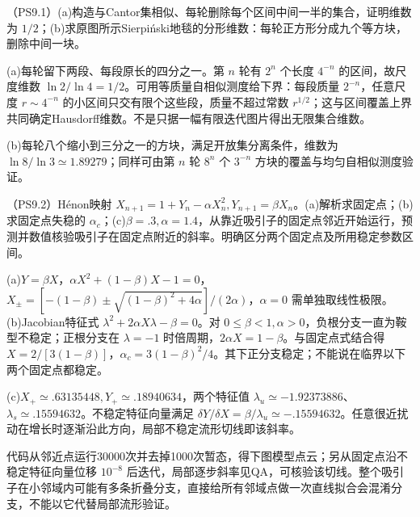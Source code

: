 \begin{exercise}
（PS9.1）(a)构造与Cantor集相似、每轮删除每个区间中间一半的集合，证明维数为 $1/2$；(b)求原图所示Sierpiński地毯的分形维数：每轮正方形分成九个等方块，删除中间一块。
\end{exercise}
\begin{solution}
(a)每轮留下两段、每段原长的四分之一。第 $n$ 轮有 $2^n$ 个长度 $4^{-n}$ 的区间，故尺度维数 $\ln2/\ln4=1/2$。可用等质量自相似测度给下界：每段质量 $2^{-n}$，任意尺度 $r\sim4^{-n}$ 的小区间只交有限个这些段，质量不超过常数 $r^{1/2}$；这与区间覆盖上界共同确定Hausdorff维数。不是只据一幅有限迭代图片得出无限集合维数。

(b)每轮八个缩小到三分之一的方块，满足开放集分离条件，维数为 $\ln8/\ln3\simeq1.89279$；同样可由第 $n$ 轮 $8^n$ 个 $3^{-n}$ 方块的覆盖与均匀自相似测度验证。
\end{solution}

\begin{exercise}
（PS9.2）Hénon映射 $X_{n+1}=1+Y_n-\alpha X_n^2,Y_{n+1}=\beta X_n$。(a)解析求固定点；(b)求固定点失稳的 $\alpha_c$；(c)$\beta=.3,\alpha=1.4$，从靠近吸引子的固定点邻近开始运行，预测并数值核验吸引子在固定点附近的斜率。明确区分两个固定点及所用稳定参数区间。
\end{exercise}
\begin{solution}
(a)$Y=\beta X$，$\alpha X^2+(1-\beta)X-1=0$，$X_\pm=[-(1-\beta)\pm\sqrt{(1-\beta)^2+4\alpha}]/(2\alpha)$，$\alpha=0$ 需单独取线性极限。(b)Jacobian特征式 $\lambda^2+2\alpha X\lambda-\beta=0$。对 $0\le\beta<1,\alpha>0$，负根分支一直为鞍型不稳定；正根分支在 $\lambda=-1$ 时倍周期，$2\alpha X=1-\beta$。与固定点式结合得 $X=2/[3(1-\beta)]$，$\alpha_c=3(1-\beta)^2/4$。其下正分支稳定；不能说在临界以下两个固定点都稳定。

(c)$X_+\simeq.63135448,Y_+\simeq.18940634$，两个特征值 $\lambda_u\simeq-1.92373886$、$\lambda_s\simeq.15594632$。不稳定特征向量满足 $\delta Y/\delta X=\beta/\lambda_u\simeq-.15594632$。任意很近扰动在增长时逐渐沿此方向，局部不稳定流形切线即该斜率。

代码从邻近点运行30000次并去掉1000次暂态，得下图模型点云；另从固定点沿不稳定特征向量位移 $10^{-8}$ 后迭代，局部逐步斜率见QA，可核验该切线。整个吸引子在小邻域内可能有多条折叠分支，直接给所有邻域点做一次直线拟合会混淆分支，不能以它代替局部流形验证。
\begin{center}\end{center}
\end{solution}

